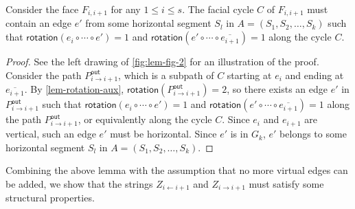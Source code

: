 \documentclass{article}\usepackage[a4paper,margin=20mm]{geometry}
\newcommand{\Pout}{P^{\mathsf{out}}}
\newcommand{\rotation}{\mathsf{rotation}}
\begin{document}
\begin{lemma}\label{lem-horizontal-exist}
Consider the face $F_{i,i+1}$ for any $1 \leq i \leq s$. The facial cycle $C$ of $F_{i,i+1}$ must contain an edge $e'$ from some horizontal segment $S_l$ in $A=(S_1, S_2, \ldots, S_k)$ such that $\rotation(e_i \circ \cdots \circ e')=1$  and $\rotation(e' \circ \cdots \circ \overline{e_{i+1}})=1$ along the cycle $C$.
\end{lemma}
\begin{proof}
 See the left drawing of \cref{fig:lem-fig-2} for an illustration of the proof. Consider the path $\Pout_{i\rightarrow i+1}$, which is a subpath of $C$ starting at $e_i$ and ending at $\overline{e_{i+1}}$. By \cref{lem-rotation-aux},  $\rotation(\Pout_{i\rightarrow i+1}) = 2$, so there exists an edge $e'$ in $\Pout_{i\rightarrow i+1}$ such that $\rotation(e_i \circ \cdots \circ e')=1$  and $\rotation(e' \circ \cdots \circ \overline{e_{i+1}})=1$ along the path $\Pout_{i\rightarrow i+1}$, or equivalently along the cycle $C$. Since $e_i$ and $e_{i+1}$ are vertical, such an edge $e'$ must be horizontal. Since $e'$ is in $G_k$, $e'$ belongs to some horizontal segment $S_l$ in $A=(S_1, S_2, \ldots, S_k)$. 
\end{proof}

Combining the above lemma with the assumption that no more virtual edges can be added, we show that the strings $Z_{i \leftarrow i+1}$ and $Z_{i \rightarrow i+1}$ must satisfy some structural properties.
\end{document}

